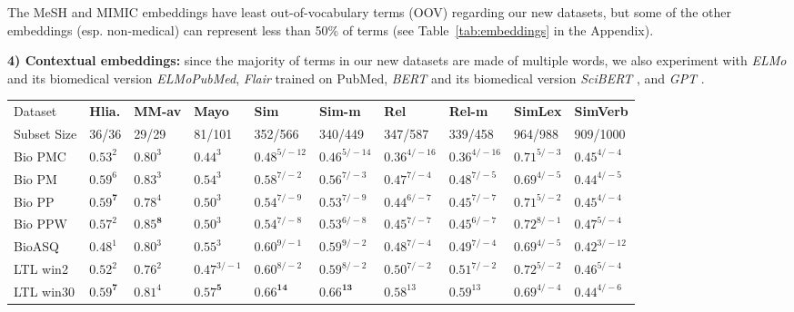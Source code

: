 \documentclass[letterpaper]{article} %
\begin{document}
The MeSH and MIMIC embeddings have least out-of-vocabulary terms (OOV) regarding our new datasets, but some of the other embeddings (esp. non-medical) can represent less than 50\% of terms (see Table~\ref{tab:embeddings} in the Appendix).

\noindent \textbf{4) Contextual embeddings:} since the majority of terms in our new datasets are made of multiple words, we also experiment with
\emph{ELMo} \cite{peters-etal-2018-deep} and its biomedical version \emph{ELMoPubMed}, \emph{Flair} \cite{akbik2019naacl} trained on PubMed, \emph{BERT}  \cite{DBLP:journals/corr/abs-1810-04805} and its biomedical version \emph{SciBERT} \cite{Beltagy2019SciBERT}, and \emph{GPT} \cite{Radford2018ImprovingLU}.

\begin{table*}[th]
    \centering
    \small
    \begin{tabular}{l l l l l l l l l l}
         Dataset & \textbf{Hlia.} & \textbf{MM-av} & \textbf{Mayo} & \textbf{Sim} & \textbf{Sim-m} & \textbf{Rel} & \textbf{Rel-m} & \textbf{SimLex} & \textbf{SimVerb}\\
         Subset Size & 36/36 & 29/29 & 81/101 & 352/566 & 340/449 & 347/587 & 339/458 & 964/988 & 909/1000\\
         \midrule
Bio PMC & $0.53^{2}$ & $0.80^{3}$ & $0.44^{3}$ & $0.48^{5/-12}$ & $0.46^{5/-14}$ & $0.36^{4/-16}$ & $0.36^{4/-16}$ & $0.71^{5/-3}$ & $0.45^{4/-4}$ \\
Bio PM & $0.59^{6}$ & $0.83^{3}$ & $0.54^{3}$ & $0.58^{7/-2}$ & $0.56^{7/-3}$ & $0.47^{7/-4}$ & $0.48^{7/-5}$ & $0.69^{4/-5}$ & $0.44^{4/-5}$ \\
Bio PP & $\mathbf{0.59^{7}}$ & $0.78^{4}$ & $0.50^{3}$ & $0.54^{7/-9}$ & $0.53^{7/-9}$ & $0.44^{6/-7}$ & $0.45^{7/-7}$ & $0.71^{5/-2}$ & $0.45^{4/-4}$ \\
Bio PPW & $0.57^{2}$ & $\mathbf{0.85^{8}}$ & $0.50^{3}$ & $0.54^{7/-8}$ & $0.53^{6/-8}$ & $0.45^{7/-7}$ & $0.45^{6/-7}$ & $0.72^{8/-1}$ & $0.47^{5/-4}$ \\
BioASQ & $0.48^{1}$ & $0.80^{3}$ & $0.55^{3}$ & $0.60^{9/-1}$ & $0.59^{9/-2}$ & $0.48^{7/-4}$ & $0.49^{7/-4}$ & $0.69^{4/-5}$ & $0.42^{3/-12}$ \\
LTL win2 & $0.52^{2}$ & $0.76^{2}$ & $0.47^{3/-1}$ & $0.60^{8/-2}$ & $0.59^{8/-2}$ & $0.50^{7/-2}$ & $0.51^{7/-2}$ & $0.72^{5/-2}$ & $0.46^{5/-4}$ \\
LTL win30 & $\mathbf{0.59^{7}}$ & $0.81^{4}$ & $\mathbf{0.57^{5}}$ & $\mathbf{0.66^{14}}$ & $\mathbf{0.66^{13}}$ & $0.58^{13}$ & $0.59^{13}$ & $0.69^{4/-4}$ & $0.44^{4/-6}$ \\

\end{tabular}
\end{table*}
\end{document}
